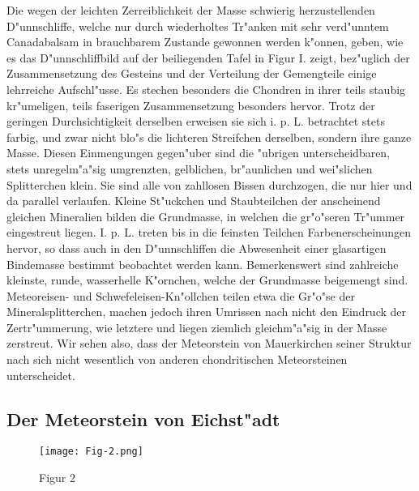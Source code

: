 \documentclass[a4paper, 11pt, oneside]{article}
\begin{document}
Die wegen der leichten Zerreiblichkeit der Masse schwierig herzustellenden D"unnschliffe, welche nur durch wiederholtes Tr"anken mit sehr verd"unntem Canadabalsam in brauchbarem Zustande gewonnen werden k"onnen, geben, wie es das D"unnschliffbild auf der beiliegenden Tafel in Figur I. zeigt, bez"uglich der Zusammensetzung des Gesteins und der Verteilung der Gemengteile einige lehrreiche Aufschl"usse. Es stechen besonders die Chondren in ihrer teils staubig kr"umeligen, teils faserigen Zusammensetzung besonders hervor. Trotz der geringen Durchsichtigkeit derselben erweisen sie sich i. p. L. betrachtet stets farbig, und zwar nicht blo"s die lichteren Streifchen derselben, sondern ihre ganze Masse. Diesen Einmengungen gegen"uber sind die "ubrigen unterscheidbaren, stets unregelm"a"sig umgrenzten, gelblichen, br"aunlichen und wei"slichen Splitterchen klein. Sie sind alle von zahllosen Bissen durchzogen, die nur hier und da parallel verlaufen. Kleine St"uckchen und Staubteilchen der anscheinend gleichen Mineralien bilden die Grundmasse, in welchen die gr"o"seren Tr"ummer eingestreut liegen. I. p. L. treten bis in die feinsten Teilchen Farbenerscheinungen hervor, so dass auch in den D"unnschliffen die Abwesenheit einer glasartigen Bindemasse bestimmt beobachtet werden kann. Bemerkenswert sind zahlreiche kleinste, runde, wasserhelle K"ornchen, welche der Grundmasse beigemengt sind. Meteoreisen- und Schwefeleisen-Kn"ollchen teilen etwa die Gr"o"se der Mineralsplitterchen, machen jedoch ihren Umrissen nach nicht den Eindruck der Zertr"ummerung, wie letztere und liegen ziemlich gleichm"a"sig in der Masse zerstreut. Wir sehen also, dass der Meteorstein von Mauerkirchen seiner Struktur nach sich nicht wesentlich von anderen chondritischen Meteorsteinen unterscheidet.
\clearpage
\subsection{Der Meteorstein von Eichst"adt}
\begin{figure}[h]
\centering
\texttt{[image: Fig-2.png]}
\caption{Figur 2}
\end{figure}
\end{document}
